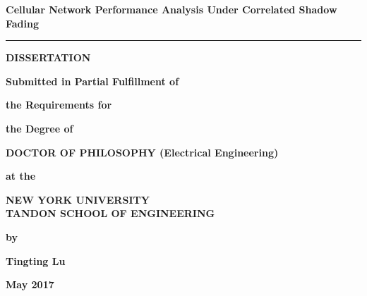  \baselineskip \thispagestyle{empty}

\begin{center}
{\large \bf Cellular Network Performance Analysis Under Correlated Shadow Fading} %
 \vspace{0.3in}

 \rule{2.5in}{0.01in}
 
 \vspace{0.3in}
 
{\large \bf DISSERTATION}

\vspace{0.4in}

{\large \bf Submitted in Partial Fulfillment of}
\vspace{0.1in}

{\large \bf the Requirements for}
\vspace{0.1in}

{\large \bf the Degree of} \vspace{0.4in}

{\large \bf DOCTOR OF PHILOSOPHY (Electrical Engineering)}

\vspace{0.4in}
{\large \bf at the}
\vspace{0.15in}

{\large \bf NEW YORK UNIVERSITY\\
TANDON SCHOOL OF ENGINEERING} 
\vspace{0.2in}

{\large \bf by}
\vspace{0.4in}

{\large \bf Tingting Lu} 
\vspace{0.4in}

{\large \bf May 2017}
\end{center}

